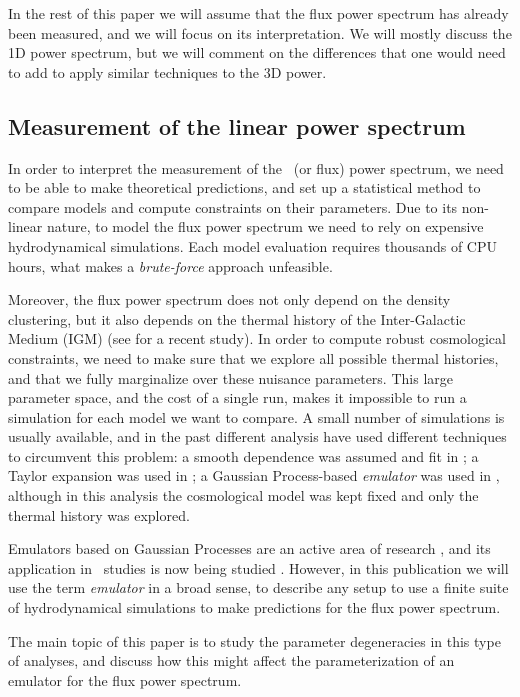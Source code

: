 In the rest of this paper we will assume that the flux power spectrum
has already been measured, and we will focus on its interpretation.
We will mostly discuss the 1D power spectrum, but we will comment on the
differences that one would need to add to apply similar techniques to the
3D power.


\subsection{Measurement of the linear power spectrum}

In order to interpret the measurement of the \lya\ (or flux) power spectrum,
we need to be able to make theoretical predictions, and set up a statistical
method to compare models and compute constraints on their parameters.
Due to its non-linear nature, to model the flux power
spectrum we need to rely on expensive hydrodynamical simulations.
Each model evaluation requires thousands of CPU hours, what makes a
\textit{brute-force} approach unfeasible.

Moreover, the flux power spectrum does not only depend on the density
clustering, but it also depends on the thermal history of the
Inter-Galactic Medium (IGM) (see \cite{Walther2018b} for a recent study).
In order to compute robust cosmological constraints, we need to make sure
that we explore all possible thermal histories, and that we fully marginalize
over these nuisance parameters.
This large parameter space, and the cost of a single run, makes it impossible
to run a simulation for each model we want to compare.
A small number of simulations is usually available, and in the past different
analysis have used different techniques to circumvent this problem:
a smooth dependence was assumed and fit in \cite{McDonald2005a};
a Taylor expansion was used in \cite{Palanque-Delabrouille2013};
a Gaussian Process-based \textit{emulator} was used in
\cite{Walther2018a,Walther2018b}, although in this analysis the cosmological
model was kept fixed and only the thermal history was explored.

Emulators based on Gaussian Processes are an active area of research
\cite{Heitmann2009,Heitmann2014,SLAC2018}, and its application in \lya\
studies is now being studied \cite{Walther2018a,Bird2018,Rogers2018c}.
However, in this publication we will use the term \textit{emulator} in a broad
sense, to describe any setup to use a finite suite of hydrodynamical
simulations to make predictions for the flux power spectrum.

The main topic of this paper is to study the parameter degeneracies in this
type of analyses, and discuss how this might affect the parameterization of
an emulator for the flux power spectrum.

